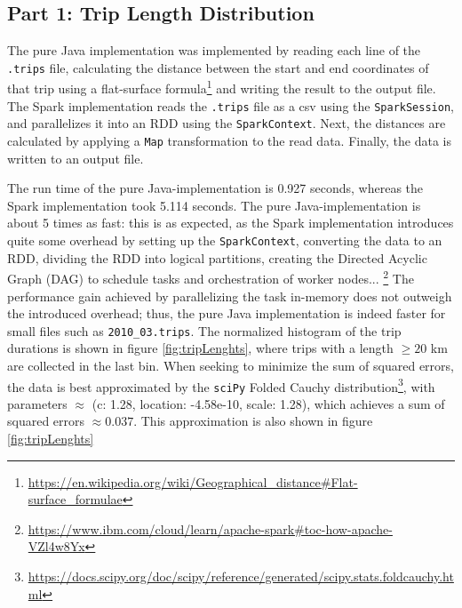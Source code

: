 \documentclass[11pt]{article}
\title{\vspace{-2.5cm}{\myfont Report Project 2: BDAP [B-KUL-H00Y4A]}}
\author{Andreas Hinderyckx - r0760777}
\date{\vspace{-.2cm}}
\begin{document}
\maketitle

\vspace{-1.5cm}
\subsection*{Part 1: Trip Length Distribution}
The pure Java implementation was implemented by reading each line of the \texttt{.trips} file, calculating the distance between the start and end coordinates of that trip using a flat-surface formula\footnote{\url{https://en.wikipedia.org/wiki/Geographical_distance\#Flat-surface_formulae}} and writing the result to the output file. The Spark implementation reads the \texttt{.trips} file as a csv using the \texttt{SparkSession}, and parallelizes it into an RDD using the \texttt{SparkContext}. Next, the distances are calculated by applying a \texttt{Map} transformation to the read data. Finally, the data is written to an output file.

The run time of the pure Java-implementation is 0.927 seconds, whereas the Spark implementation took 5.114 seconds. The pure Java-implementation is about 5 times as fast: this is as expected, as the Spark implementation introduces quite some overhead by setting up the \texttt{SparkContext}, converting the data to an RDD, dividing the RDD into logical partitions, creating the Directed Acyclic Graph (DAG) to schedule tasks and orchestration of worker nodes... \footnote{\url{https://www.ibm.com/cloud/learn/apache-spark\#toc-how-apache-VZl4w8Yx}} The performance gain achieved by parallelizing the task in-memory does not outweigh the introduced overhead; thus, the pure Java implementation is indeed faster for small files such as \texttt{2010\_03.trips}.
The normalized histogram of the trip durations is shown in figure \ref{fig:tripLenghts}, where trips with a length $\geq20$ km are collected in the last bin. When seeking to minimize the sum of squared errors, the data is best approximated by the \texttt{sciPy} Folded Cauchy distribution\footnote{\url{https://docs.scipy.org/doc/scipy/reference/generated/scipy.stats.foldcauchy.html}}, with parameters $\approx$ (c: 1.28, location: -4.58e-10, scale: 1.28), which achieves a sum of squared errors $\approx 0.037$. This approximation is also shown in figure \ref{fig:tripLenghts}
\end{document}
